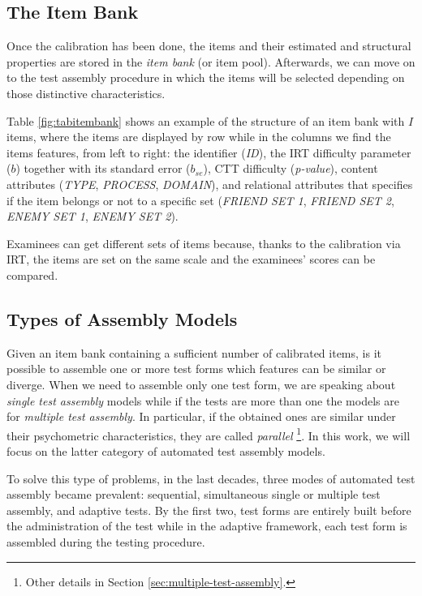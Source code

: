 \subsection{The Item Bank}\label{sec:the-item-bank}
Once the calibration has been done, the items and their estimated and structural properties are stored in the \emph{item bank} (or item pool). Afterwards, we can move on to the test assembly procedure in which the items will be selected depending on those distinctive characteristics.

Table \ref{fig:tabitembank} shows an example of the structure of an item bank with $I$ items, where the items are displayed by row while in the columns we find the items features, from left to right: the identifier (\textsl{ID}), the IRT difficulty parameter ($b$) together with its standard error ($b_{se}$), CTT difficulty (\textsl{p-value}), content attributes (\textsl{TYPE}, \textsl{PROCESS}, \textsl{DOMAIN}), and relational attributes that specifies if the item belongs or not to a specific set (\textsl{FRIEND SET 1}, \textsl{FRIEND SET 2}, \textsl{ENEMY SET 1}, \textsl{ENEMY SET 2}).

Examinees can get different sets of items because, thanks to the calibration via IRT, the items are set on the same scale and the examinees' scores can be compared.

\subsection{Types of Assembly Models}\label{sec:assembly-models}

Given an item bank containing a sufficient number of calibrated items, is it possible to assemble one or more test forms which features can be similar or diverge.
When we need to assemble only one test form, we are speaking about \emph{single test assembly} models while if the tests are more than one the models are for \emph{multiple test assembly}.
In particular, if the obtained ones are similar under their psychometric characteristics, they are called \emph{parallel} \footnote{Other details in Section \ref{sec:multiple-test-assembly}.}.
In this work, we will focus on the latter category of automated test assembly models.

To solve this type of problems, in the last decades, three modes of automated test assembly became prevalent: sequential, simultaneous single or multiple test assembly, and adaptive tests.
By the first two, test forms are entirely built before the administration of the test while in the adaptive framework, each test form is assembled during the testing procedure.

